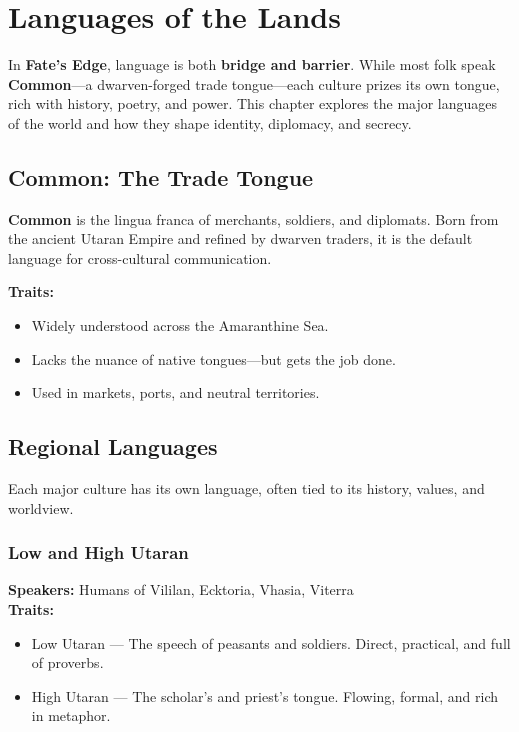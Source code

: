 
\chapter{Languages of the Lands}

In \textbf{Fate’s Edge}, language is both \textbf{bridge and barrier}. While most folk speak \textbf{Common}—a dwarven-forged trade tongue—each culture prizes its own tongue, rich with history, poetry, and power. This chapter explores the major languages of the world and how they shape identity, diplomacy, and secrecy.

\section{Common: The Trade Tongue}

\textbf{Common} is the lingua franca of merchants, soldiers, and diplomats. Born from the ancient Utaran Empire and refined by dwarven traders, it is the default language for cross-cultural communication.

\textbf{Traits:}
\begin{itemize}
  \item Widely understood across the Amaranthine Sea.
  \item Lacks the nuance of native tongues—but gets the job done.
  \item Used in markets, ports, and neutral territories.
\end{itemize}

\section{Regional Languages}

Each major culture has its own language, often tied to its history, values, and worldview.

\subsection*{Low and High Utaran}

\textbf{Speakers:} Humans of Vililan, Ecktoria, Vhasia, Viterra \\
\textbf{Traits:} 
\begin{itemize}
  \item Low Utaran — The speech of peasants and soldiers. Direct, practical, and full of proverbs.
  \item High Utaran — The scholar's and priest's tongue. Flowing, formal, and rich in metaphor.
\end{itemize}

